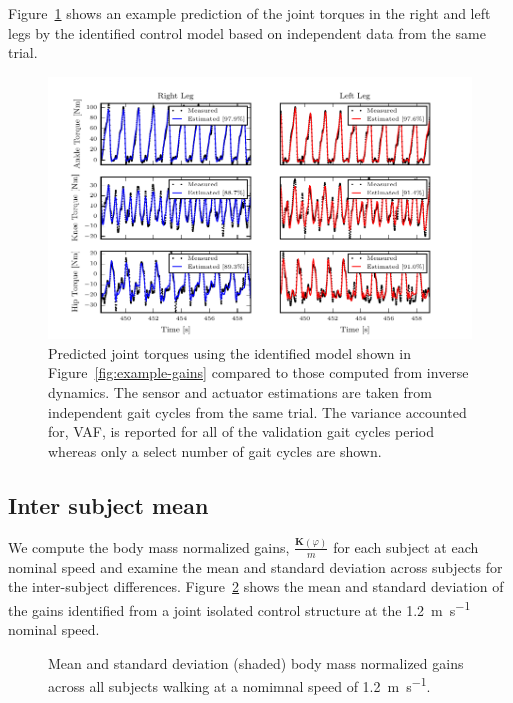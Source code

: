 \documentclass{article}
\begin{document}
Figure~\ref{fig:example-fit} shows an example prediction of the joint torques
in the right and left legs by the identified control model based on independent
data from the same trial. 
%
\begin{figure}
  \begin{center}
    \includegraphics{figures/example-identified-joint-isolated-fit.pdf}
    \caption{Predicted joint torques using the identified model shown in
      Figure~\ref{fig:example-gains} compared to those computed from inverse
      dynamics. The sensor and actuator estimations are taken from independent
      gait cycles from the same trial. The variance accounted for, VAF, is
      reported for all of the validation gait cycles period whereas only a select
      number of gait cycles are shown.}
    \label{fig:example-fit}
  \end{center}
\end{figure}

\subsection*{Inter subject mean}
%
We compute the body mass normalized gains, $\frac{\mathbf{K}(\varphi)}{m}$ for
each subject at each nominal speed and examine the mean and standard deviation
across subjects for the inter-subject differences.
Figure~\ref{fig:mean-gains-1-2} shows the mean and standard deviation of the
gains identified from a joint isolated control structure at the
1.2~\si{\meter\per\second} nominal speed.
%
\begin{figure}
  \begin{center}
    \caption{Mean and standard deviation (shaded) body mass normalized gains
      across all subjects walking at a nomimnal speed of
      1.2~\si{\meter\per\second}.}
    \label{fig:mean-gains-1-2}
  \end{center}
\end{figure}
\end{document}
